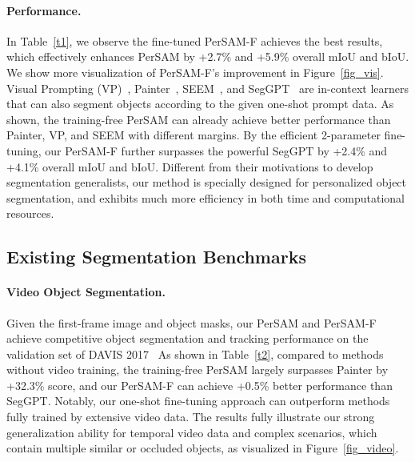 \documentclass{article} \usepackage{iclr2024_conference,times}
\begin{document}
\paragraph{Performance.}
In Table~\ref{t1}, we observe the fine-tuned PerSAM-F achieves the best results, which effectively enhances PerSAM by +2.7\% and +5.9\% overall mIoU and bIoU. We show more visualization of PerSAM-F's improvement in Figure~\ref{fig_vis}.
Visual Prompting (VP)~\citep{bar2022visual}, Painter~\citep{wang2022images}, SEEM~\citep{zou2023segment}, and SegGPT~\citep{wang2023seggpt} are in-context learners that can also segment objects according to the given one-shot prompt data.
As shown, the training-free PerSAM can already achieve better performance than Painter, VP, and SEEM with different margins. By the efficient 2-parameter fine-tuning, our PerSAM-F further surpasses the powerful SegGPT by +2.4\% and +4.1\% overall mIoU and bIoU. Different from their motivations to develop segmentation generalists, our method is specially designed for personalized object segmentation, and exhibits much more efficiency in both time and computational resources.



\subsection{Existing Segmentation Benchmarks}
\label{s4.2}


\paragraph{Video Object Segmentation.}
Given the first-frame image and object masks, our PerSAM and PerSAM-F achieve competitive object segmentation and tracking performance on the validation set of DAVIS 2017~\citep{pont20172017} 
As shown in Table~\ref{t2}, compared to methods without video training, the training-free PerSAM largely surpasses Painter by +32.3\%  score, and our PerSAM-F can achieve +0.5\% better performance than SegGPT. Notably, our one-shot fine-tuning approach can outperform methods~\citep{lin2019agss,liang2020video} fully trained by extensive video data. The results fully illustrate our strong generalization ability for temporal video data and complex scenarios, which contain multiple similar or occluded objects, as visualized in Figure~\ref{fig_video}.
\vspace{-0.1cm}
\end{document}
